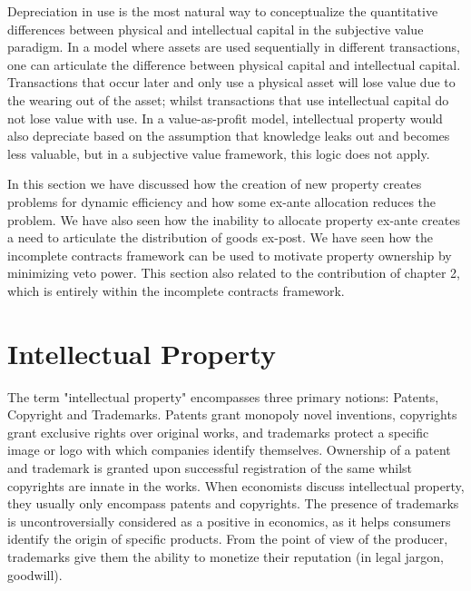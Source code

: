 Depreciation in use is the most natural way to conceptualize the quantitative differences between physical and intellectual capital in the subjective value paradigm. In a model where assets are used sequentially in different transactions, one can articulate the difference between physical capital and intellectual capital. Transactions that occur later and only use a physical asset will lose value due to the wearing out of the asset; whilst transactions that use intellectual capital do not lose value with use. In a value-as-profit model, intellectual property would also depreciate based on the assumption that knowledge leaks out and becomes less valuable, but in a subjective value framework, this logic does not apply.

In this section we have discussed how the creation of new property creates problems for dynamic efficiency and how some ex-ante allocation reduces the problem. We have also seen how the inability to allocate property ex-ante creates a need to articulate the distribution of goods ex-post. We have seen how the incomplete contracts framework can be used to motivate property ownership by minimizing veto power. This section also related to the contribution of chapter 2, which is entirely within the incomplete contracts framework.

\newpage
\section{Intellectual Property}\label{intellectual}

The term "intellectual property" encompasses three primary notions: Patents, Copyright and Trademarks. Patents grant monopoly novel inventions, copyrights grant exclusive rights over original works, and trademarks protect a specific image or logo with which companies identify themselves. Ownership of a patent and trademark is granted upon successful registration of the same whilst copyrights are innate in the works. When economists discuss intellectual property, they usually only encompass patents and copyrights. The presence of trademarks is uncontroversially considered as a positive in economics, as it helps consumers identify the origin of specific products. From the point of view of the producer, trademarks give them the ability to monetize their reputation (in legal jargon, goodwill). 


